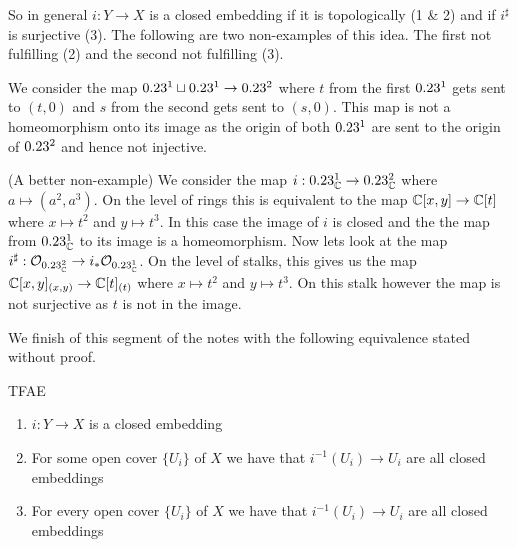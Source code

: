 So in general $i : Y \to X$ is a closed embedding if it is topologically (1 \& 2) and if $i^\sharp$ is surjective (3). The following are two non-examples of this idea. The first not fulfilling (2) and the second not fulfilling (3). 
\begin{nonexample}
    We consider the map $0.23^1 \sqcup 0.23^1 \to 0.23^2$ where $t$ from the first $0.23^1$ gets sent to $(t, 0)$ and $s$ from the second gets sent to $(s, 0)$. This map is not a homeomorphism onto its image as the origin of both $0.23^1$ are sent to the origin of $0.23^2$ and hence not injective. 
\end{nonexample}
\begin{nonexample}
    (A better non-example) We consider the map $i : 0.23^1_{\mathbb{C}} \to 0.23^2_{\mathbb{C}}$ where $a \mapsto (a^2, a^3)$. On the level of rings this is equivalent to the map $\mathbb{C}[x, y] \to \mathbb{C}[t]$ where $x \mapsto t^2$ and $y \mapsto t^3$. In this case the image of $i$ is closed and the the map from $0.23^1_{\mathbb{C}}$ to its image is a homeomorphism. Now lets look at the map $i^\sharp : \mathcal{O}_{0.23^2_{\mathbb{C}}} \to i_*\mathcal{O}_{0.23^1_{\mathbb{C}}}$. On the level of stalks, this gives us the map $\mathbb{C}[x, y]_{(x, y)} \to \mathbb{C}[t]_{(t)}$ where $x \mapsto t^2$ and $y \mapsto t^3$. On this stalk however the map is not surjective as $t$ is not in the image. 
\end{nonexample}
We finish of this segment of the notes with the following equivalence stated without proof. 
\begin{proposition}
    TFAE
    \begin{enumerate}
        \item $i : Y \to X$ is a closed embedding
        \item For some open cover $\{U_i\}$ of $X$ we have that $i^{-1}(U_i) \to U_i$ are all closed embeddings
        \item For every open cover $\{U_i\}$ of $X$ we have that $i^{-1}(U_i) \to U_i$ are all closed embeddings
    \end{enumerate}
\end{proposition}
